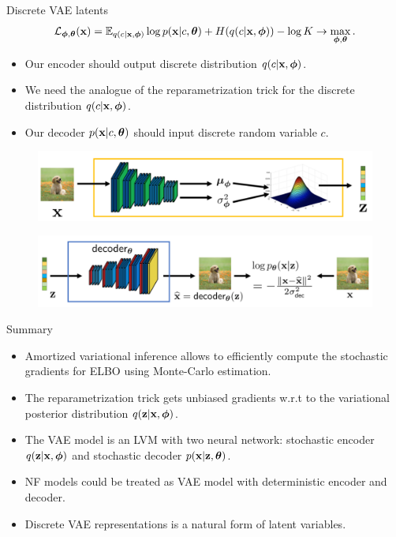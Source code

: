\begin{frame}{Discrete VAE latents}
	\vspace{-0.3cm}
	\[
		\mathcal{L}_{\boldsymbol{\phi}, \boldsymbol{\theta}}(\mathbf{x})  = \mathbb{E}_{q(c | \mathbf{x}, \boldsymbol{\phi})} \log p(\mathbf{x} | c, \boldsymbol{\theta}) + H(q(c | \mathbf{x}, \boldsymbol{\phi})) - \log K \rightarrow \max_{\boldsymbol{\phi}, \boldsymbol{\theta}}.
	\]
	\vspace{-0.3cm}
	\begin{itemize}
		\item Our encoder should output discrete distribution $q(c | \mathbf{x}, \boldsymbol{\phi})$.
		\item We need the analogue of the reparametrization trick for the discrete distribution $q(c | \mathbf{x}, \boldsymbol{\phi})$.
		\item Our decoder $p(\mathbf{x} | c, \boldsymbol{\theta})$ should input discrete random variable $c$.
	\end{itemize}
	\begin{figure}[h]
		\centering
		\includegraphics[width=0.7\linewidth]{figs/vae-encoder}
	\end{figure}
	\begin{figure}[h]
		\centering
		\includegraphics[width=0.9\linewidth]{figs/vae-decoder}
	\end{figure}
\end{frame}
\begin{frame}{Summary}
	\begin{itemize}
		\item Amortized variational inference allows to efficiently compute the stochastic gradients for ELBO using Monte-Carlo estimation.
		\vfill
		\item The reparametrization trick gets unbiased gradients w.r.t to the variational posterior distribution $q(\mathbf{z} | \mathbf{x}, \boldsymbol{\phi})$.
		\vfill
		\item The VAE model is an LVM with two neural network: stochastic encoder $q(\mathbf{z} | \mathbf{x}, \boldsymbol{\phi})$ and stochastic decoder $p(\mathbf{x} | \mathbf{z}, \boldsymbol{\theta})$.
		\vfill
		\item NF models could be treated as VAE model with deterministic encoder and decoder.
		\vfill
		\item Discrete VAE representations is a natural form of latent variables.
	\end{itemize}
\end{frame}
 